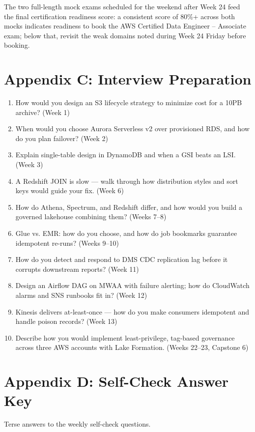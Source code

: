 \documentclass[11pt, a4paper]{article}
\begin{document}
The two full-length mock exams scheduled for the weekend after Week 24 feed the final certification readiness score: a consistent score of 80\%+ across both mocks indicates readiness to book the AWS Certified Data Engineer -- Associate exam; below that, revisit the weak domains noted during Week 24 Friday before booking.

\section{Appendix C: Interview Preparation}
\begin{enumerate}[itemsep=1pt]
    \item How would you design an S3 lifecycle strategy to minimize cost for a 10PB archive? (Week 1)
    \item When would you choose Aurora Serverless v2 over provisioned RDS, and how do you plan failover? (Week 2)
    \item Explain single-table design in DynamoDB and when a GSI beats an LSI. (Week 3)
    \item A Redshift JOIN is slow --- walk through how distribution styles and sort keys would guide your fix. (Week 6)
    \item How do Athena, Spectrum, and Redshift differ, and how would you build a governed lakehouse combining them? (Weeks 7--8)
    \item Glue vs. EMR: how do you choose, and how do job bookmarks guarantee idempotent re-runs? (Weeks 9--10)
    \item How do you detect and respond to DMS CDC replication lag before it corrupts downstream reports? (Week 11)
    \item Design an Airflow DAG on MWAA with failure alerting; how do CloudWatch alarms and SNS runbooks fit in? (Week 12)
    \item Kinesis delivers at-least-once --- how do you make consumers idempotent and handle poison records? (Week 13)
    \item Describe how you would implement least-privilege, tag-based governance across three AWS accounts with Lake Formation. (Weeks 22--23, Capstone 6)
\end{enumerate}

\newpage
\section{Appendix D: Self-Check Answer Key}
Terse answers to the weekly self-check questions.
\end{document}

